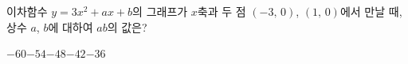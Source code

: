 이차함수 $y=3x^2+ax+b$의 그래프가 $x$축과 두 점 $(-3,\,0)$, $(1,\,0)$에서 만날 때, 상수 $a$, $b$에 대하여 $ab$의 값은?
\begin{choices32}{$-60$}{$-54$}{$-48$}{$-42$}{$-36$}\end{choices32}
